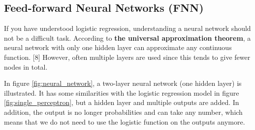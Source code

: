 \subsection{Feed-forward Neural Networks (FNN)} \label{sec:neural_network}
If you have understood logistic regression, understanding a neural network should not be a difficult task. According to  \textbf{the universal approximation theorem}, a neural network with only one hidden layer can approximate any continuous function. [8] However, often multiple layers are used since this tends to give fewer nodes in total. 

In figure \eqref{fig:neural_network}, a two-layer neural network (one hidden layer) is illustrated. It has some similarities with the logistic regression model in figure \eqref{fig:single_perceptron}, but a hidden layer and multiple outputs are added. In addition, the output is no longer probabilities and can take any number, which means that we do not need to use the logistic function on the outputs anymore.

